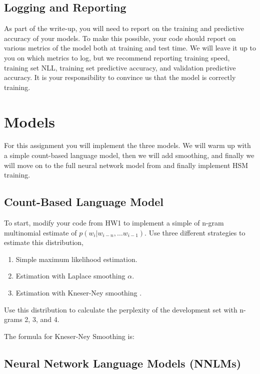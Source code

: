 \documentclass[11pt]{article}
\begin{document}
\subsection{Logging and Reporting}

As part of the write-up, you will need to report on the training and
predictive accuracy of your models. To make this possible, your code
should report on various metrics of the model both at training and
test time. We will leave it up to you on which metrics to log, but we
recommend reporting training speed, training set NLL, training set
predictive accuracy, and validation predictive accuracy. It is your
responsibility to convince us that the model is correctly training.

\section{Models}

For this assignment you will implement the three models. We will warm
up with a simple count-based language model, then we will add
smoothing, and finally we will move on to the full neural network
model from \citet{bengio} and finally implement HSM training.

\subsection{Count-Based Language Model}

To start, modify your code from HW1 to implement a simple of
n-gram multinomial estimate of $p(w_i | w_{i-n}, \ldots w_{i-1})$. 
Use three different strategies to estimate this distribution,

\begin{enumerate}
\item Simple maximum likelihood estimation. 
\item Estimation with Laplace smoothing $\alpha$.
\item Estimation with Kneser-Ney smoothing \cite{}. 
\end{enumerate}

Use this distribution to calculate the perplexity of the development
set with n-grams 2, 3, and 4.


The formula for Kneser-Ney Smoothing is: 

\subsection{Neural Network Language Models (NNLMs)}
\end{document}
